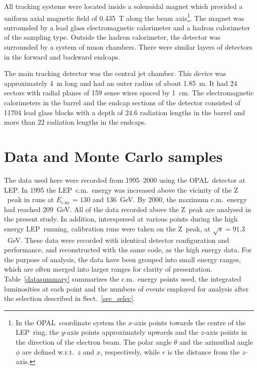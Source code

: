 \documentclass[12pt,a4paper,twoside]{article}
\newcommand{\zzero}  {\ensuremath{\mathrm{Z}}}
\newcommand{\ecm}   {\ensuremath{E_{\mathrm{c.m.}}}}
\newcommand{\Opal}{\mbox{\rm OPAL}}
\newcommand{\Lep}{\mbox{LEP}}
\begin{document}
All tracking systems were located inside a solenoidal magnet which
provided a uniform axial magnetic field of 0.435~T along the beam
axis\footnote{In the \Opal\ coordinate system the $x$-axis points
  towards the centre of the \Lep\ ring, the $y$-axis points 
  approximately upwards and
  the $z$-axis points in the direction of the electron beam.  The
  polar angle $\theta$ and the azimuthal angle $\phi$ are defined
  w.r.t.\ $z$ and $x$, respectively, while $r$ is the distance from the
  $z$-axis.}.
The magnet was surrounded by a lead glass electromagnetic
calorimeter and a hadron calorimeter of the sampling type.  Outside
the hadron calorimeter, the detector was surrounded by a system of muon
chambers.  There were similar layers of detectors in the forward and
backward endcaps.
 
The main tracking detector was the central jet chamber. This device was
approximately 4~m long and had an outer radius of about 1.85~m. It had 24
sectors with radial planes of 159 sense wires spaced by 1~cm. 
The electromagnetic calorimeters in the barrel and the endcap sections
of the detector consisted of 11704 lead glass blocks with a depth of
$24.6$ radiation lengths in the barrel and more than $22$ 
radiation lengths in the endcaps.
 
\section{ Data and Monte Carlo samples }
\label{sec_datamc}
The data used here were recorded from 1995--2000 using the 
\Opal\ detector at \Lep.  In 1995 the \Lep\ c.m.\ energy was 
increased above the vicinity of the \zzero\ peak in runs at
$\ecm=130$ and 136~GeV.  By 2000, the maximum c.m.\ 
energy had reached 209~GeV.  All of the data recorded above the 
\zzero\ peak are analysed in the present study.  In addition, 
interspersed at various points during the high energy \Lep\ running, 
calibration runs were taken on the \zzero\ peak, at $\sqrt{s}=91.3$~GeV.
These data were recorded with identical detector configuration
and performance, and reconstructed with the same code, 
as the high energy data.
For the purpose of analysis, the
data have been grouped into small energy ranges, which are often
merged into larger ranges for clarity of presentation.
Table~\ref{datasummary} summarizes the c.m.\ energy points used,
the integrated luminosities at each point and the 
numbers of events employed for analysis after the selection
described in Sect.~\ref{sec_selec}.
\end{document}

